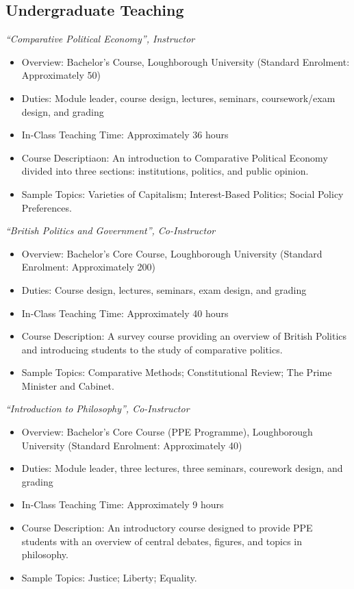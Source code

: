 \documentclass[11pt]{article}
\begin{document}
\subsection{Undergraduate Teaching}
\textit{“Comparative Political Economy”, Instructor}
	      \begin{itemize}[itemsep=0em, topsep=0em, partopsep=0em]
	      	\kern-\parskip\item Overview: Bachelor’s Course, Loughborough University (Standard Enrolment: Approximately 50)
	      	\item Duties: Module leader, course design, lectures, seminars, coursework/exam design, and grading
	      	\item In-Class Teaching Time: Approximately 36 hours 
	      	\item Course Descriptiaon: An introduction to Comparative Political Economy divided into three sections: institutions, politics, and public opinion. 
	      	\item Sample Topics: Varieties of Capitalism; Interest-Based Politics; Social Policy Preferences.
	      \end{itemize}
	\textit{“British Politics and Government”, Co-Instructor}
	      \begin{itemize}[itemsep=0em, topsep=0em, partopsep=0em]
	      	\kern-\parskip\item Overview: Bachelor’s Core Course, Loughborough University (Standard Enrolment: Approximately 200)
	      	\item Duties: Course design, lectures, seminars, exam design, and grading
	      	\item In-Class Teaching Time: Approximately 40 hours 
	      	\item Course Description: A survey course providing an overview of British Politics and introducing students to the study of comparative politics. 
	      	\item Sample Topics: Comparative Methods; Constitutional Review; The Prime Minister and Cabinet.
	      \end{itemize}
	\textit{“Introduction to Philosophy”, Co-Instructor}
	      \begin{itemize}[itemsep=0em, topsep=0em, partopsep=0em]
	      	\kern-\parskip\item Overview: Bachelor’s Core Course (PPE Programme), Loughborough University (Standard Enrolment: Approximately 40)
	      	\item Duties: Module leader, three lectures, three seminars, courework design, and grading
	      	\item In-Class Teaching Time: Approximately 9 hours
	      	\item Course Description: An introductory course designed to provide PPE students with an overview of central debates, figures, and topics in philosophy. 
	      	\item Sample Topics: Justice; Liberty; Equality.
	      \end{itemize}
\end{document}

